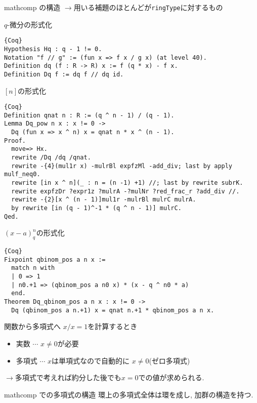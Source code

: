 \documentclass[unicode,mathserif]{beamer}
\begin{document}
\begin{frame}[fragile]
\begin{columns}[T]
\begin{column}{0.33\columnwidth}
\begin{block}{mathcomp の構造}
			$\to$用いる補題のほとんどが{\tt ringType}に対するもの
		\end{block}
		
		\begin{block}{$q$-微分の形式化}
			\begin{lstlisting}{Coq}
Hypothesis Hq : q - 1 != 0.
Notation "f // g" := (fun x => f x / g x) (at level 40).
Definition dq (f : R -> R) x := f (q * x) - f x.
Definition Dq f := dq f // dq id. \end{lstlisting}
		\end{block}
		
		\begin{block}{$[n]$の形式化}
			\begin{lstlisting}{Coq}
Definition qnat n : R := (q ^ n - 1) / (q - 1).
Lemma Dq_pow n x : x != 0 ->
  Dq (fun x => x ^ n) x = qnat n * x ^ (n - 1).
Proof.
  move=> Hx.
  rewrite /Dq /dq /qnat.
  rewrite -{4}(mul1r x) -mulrBl expfzMl -add_div; last by apply mulf_neq0.
  rewrite [in x ^ n](_ : n = (n -1) +1) //; last by rewrite subrK.
  rewrite expfzDr ?expr1z ?mulrA -?mulNr ?red_frac_r ?add_div //.
  rewrite -{2}[x ^ (n - 1)]mul1r -mulrBl mulrC mulrA.
  by rewrite [in (q - 1)^-1 * (q ^ n - 1)] mulrC.
Qed. \end{lstlisting}
		\end{block}
		
		\begin{block}{$(x - a)^n_q$の形式化}
			\begin{lstlisting}{Coq}
Fixpoint qbinom_pos a n x :=
  match n with
  | 0 => 1
  | n0.+1 => (qbinom_pos a n0 x) * (x - q ^ n0 * a)
  end. 
Theorem Dq_qbinom_pos a n x : x != 0 ->
  Dq (qbinom_pos a n.+1) x = qnat n.+1 * qbinom_pos a n x. \end{lstlisting}
		\end{block}

		\begin{block}{関数から多項式へ}
			$x / x = 1$を計算するとき
			\begin{itemize}
				\item 実数 $\cdots$ $x \ne 0$が必要
				\item 多項式 $\cdots$ $x$は単項式なので自動的に $x \ne 0$(ゼロ多項式)
			\end{itemize}
			$\to$多項式で考えれば約分した後でも$x = 0$での値が求められる.
		\end{block}
		
		\begin{block}{mathcomp での多項式の構造}
			環上の多項式全体は環を成し, 加群の構造を持つ.
			

\end{block}
\end{column}
\end{columns}
\end{frame}
\end{document}
